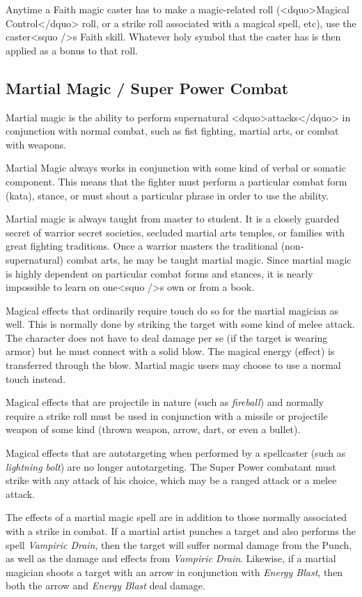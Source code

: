 Anytime a Faith magic caster has to make a magic-related roll
(<dquo>Magical Control</dquo> roll, or a strike roll associated with a magical
spell, etc), use the caster<squo />s Faith skill.  Whatever holy symbol that
the caster has is then applied as a bonus to that roll.

\subsection{Martial Magic / Super Power Combat}

Martial magic is the ability to perform supernatural <dquo>attacks</dquo> in
conjunction with normal combat, such as fist fighting, martial arts,
or combat with weapons.

Martial Magic always works in conjunction with some kind of verbal or
somatic component.  This means that the fighter must perform a
particular combat form (kata), stance, or must shout a particular
phrase in order to use the ability.

Martial magic is always taught from master to student.  It is a
closely guarded secret of warrior secret societies, secluded martial
arts temples, or families with great fighting traditions.  Once a
warrior masters the traditional (non-supernatural) combat arts, he may
be taught martial magic.  Since martial magic is highly dependent on
particular combat forms and stances, it is nearly impossible to learn
on one<squo />s own or from a book.

Magical effects that ordinarily require touch do so for the martial
magician as well.  This is normally done by striking the target with
some kind of melee attack.  The character does not have to deal damage
per se (if the target is wearing armor) but he must connect with a
solid blow.  The magical energy (effect) is transferred through the
blow.  Martial magic users may choose to use a normal touch instead.

Magical effects that are projectile in nature (such as
\emph{fireball}) and normally require a strike roll must be used in
conjunction with a missile or projectile weapon of some kind (thrown
weapon, arrow, dart, or even a bullet).

Magical effects that are autotargeting when performed by a spellcaster
(such as \emph{lightning bolt}) are no longer autotargeting.  The
Super Power combatant must strike with any attack of his choice, which
may be a ranged attack or a melee attack.

The effects of a martial magic spell are in addition to those normally
associated with a strike in combat.  If a martial artist punches a
target and also performs the spell \emph{Vampiric Drain}, then the
target will suffer normal damage from the Punch, as well as the damage
and effects from \emph{Vampiric Drain}.  Likewise, if a martial
magician shoots a target with an arrow in conjunction with
\emph{Energy Blast}, then both the arrow and \emph{Energy Blast} deal
damage.

